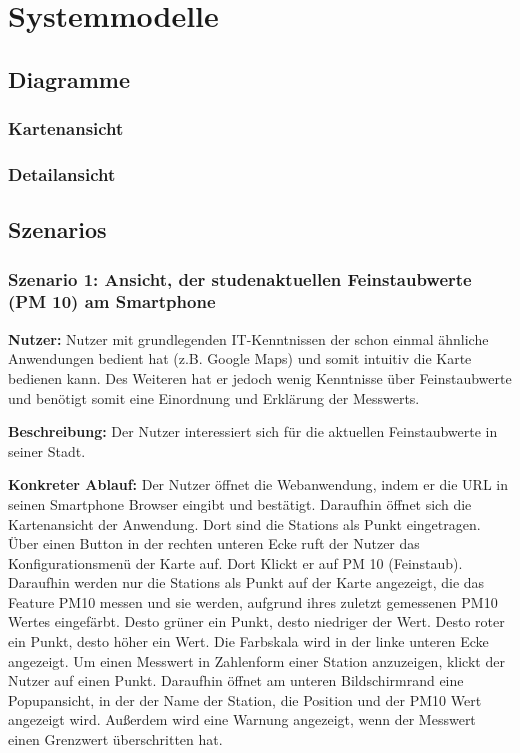 \section{Systemmodelle}

\subsection{Diagramme}

\subsubsection{Kartenansicht}
\noindent{}

\subsubsection{Detailansicht}
\noindent{}

\subsection{Szenarios}

\subsubsection{Szenario 1: Ansicht, der studenaktuellen Feinstaubwerte (PM 10) am Smartphone}
\textbf{Nutzer:} Nutzer mit grundlegenden IT-Kenntnissen der schon einmal ähnliche Anwendungen bedient hat (z.B. Google Maps) 
und somit intuitiv die Karte bedienen kann. Des Weiteren hat er jedoch wenig Kenntnisse über Feinstaubwerte und benötigt somit 
eine Einordnung und Erklärung der \glspl{Messwert}.

\textbf{Beschreibung:} Der Nutzer interessiert sich für die aktuellen Feinstaubwerte in seiner Stadt.

\textbf{Konkreter Ablauf:}
Der Nutzer öffnet die \gls{Webanwendung}, indem er die URL in seinen Smartphone Browser eingibt und bestätigt. Daraufhin öffnet 
sich die Kartenansicht der Anwendung. Dort sind die \glspl{Station} als Punkt eingetragen. Über einen Button in der rechten unteren 
Ecke ruft der Nutzer das Konfigurationsmenü der Karte auf. Dort Klickt er auf PM 10 (Feinstaub). Daraufhin werden nur die 
\glspl{Station} als Punkt auf der Karte angezeigt, die das \gls{Feature} PM10 messen und sie werden, aufgrund ihres zuletzt 
gemessenen PM10 Wertes eingefärbt. Desto grüner ein Punkt, desto niedriger der Wert. Desto roter ein Punkt, desto höher ein Wert. 
Die Farbskala wird in der linke unteren Ecke angezeigt.
Um einen \gls{Messwert} in Zahlenform einer \gls{Station} anzuzeigen, klickt der Nutzer auf einen Punkt. Daraufhin öffnet am 
unteren Bildschirmrand eine Popupansicht, in der der Name der \gls{Station}, die Position und der PM10 Wert angezeigt wird. 
Außerdem wird eine Warnung angezeigt, wenn der \gls{Messwert} einen Grenzwert überschritten hat.

